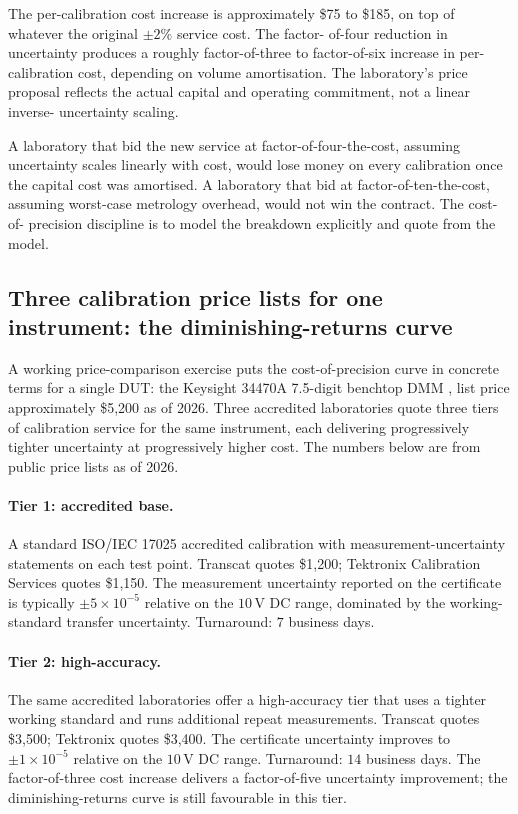 The per-calibration cost increase is approximately \$75 to \$185,
on top of whatever the original $\pm 2\%$ service cost. The factor-
of-four reduction in uncertainty produces a roughly factor-of-three
to factor-of-six increase in per-calibration cost, depending on
volume amortisation. The laboratory's price proposal reflects the
actual capital and operating commitment, not a linear inverse-
uncertainty scaling.

A laboratory that bid the new service at factor-of-four-the-cost,
assuming uncertainty scales linearly with cost, would lose money
on every calibration once the capital cost was amortised. A
laboratory that bid at factor-of-ten-the-cost, assuming worst-case
metrology overhead, would not win the contract. The cost-of-
precision discipline is to model the breakdown explicitly and
quote from the model.

\subsection{Three calibration price lists for one instrument:
the diminishing-returns curve}

A working price-comparison exercise puts the cost-of-precision
curve in concrete terms for a single DUT: the Keysight 34470A
7.5-digit benchtop DMM \cite{web:ch04t3b-keysight-34470a}, list
price approximately \$5,200 as of 2026. Three accredited
laboratories quote three tiers of calibration service for the
same instrument, each delivering progressively tighter
uncertainty at progressively higher cost. The numbers below
are from public price lists as of 2026.

\paragraph{Tier 1: accredited base.} A standard ISO/IEC 17025
accredited calibration with measurement-uncertainty statements
on each test point. Transcat \cite{web:ch04t3b-transcat-dmm-cal}
quotes \$1,200; Tektronix Calibration Services
\cite{web:ch04t3b-tektronix-cal} quotes \$1,150. The
measurement uncertainty reported on the certificate is
typically $\pm 5 \times 10^{-5}$ relative on the $10\,\si{
\volt}$ DC range, dominated by the working-standard transfer
uncertainty. Turnaround: $7$ business days.

\paragraph{Tier 2: high-accuracy.} The same accredited
laboratories offer a high-accuracy tier that uses a tighter
working standard and runs additional repeat measurements.
Transcat quotes \$3,500; Tektronix quotes \$3,400. The
certificate uncertainty improves to $\pm 1 \times 10^{-5}$
relative on the $10\,\si{\volt}$ DC range. Turnaround: $14$
business days. The factor-of-three cost increase delivers a
factor-of-five uncertainty improvement; the diminishing-returns
curve is still favourable in this tier.

